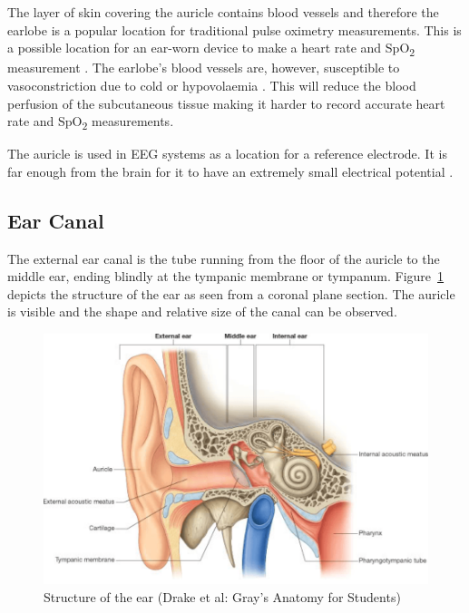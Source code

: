 The layer of skin covering the auricle contains blood vessels and therefore the earlobe is a popular location for traditional pulse oximetry measurements. This is a possible location for an ear-worn device to make a heart rate and SpO\textsubscript{2} measurement \citep{poh2010motion}. The earlobe's blood vessels are, however, susceptible to vasoconstriction due to cold or hypovolaemia \citep{WHO2011UsingPulseOxi}. This will reduce the blood perfusion of the subcutaneous tissue making it harder to record accurate heart rate and SpO\textsubscript{2} measurements.

\medskip
The auricle is used in EEG systems as a location for a reference electrode. It is far enough from the brain for it to have an extremely small electrical potential \citep{nunez2006electric}.

\subsection{Ear Canal}
The external ear canal is the tube running from the floor of the auricle to the middle ear, ending blindly at the tympanic membrane or tympanum. Figure~\ref{fig:EarSection} depicts the structure of the ear as seen from a coronal plane section. The auricle is visible and the shape and relative size of the canal can be observed.

\medskip

\begin{figure}[H]
   \centering
   \includegraphics[scale=0.7]{figs/EarSection}
   \caption{Structure of the ear (Drake et al: Gray's Anatomy for Students)}
   \label{fig:EarSection}
\end{figure}
 
